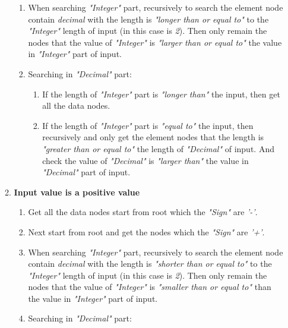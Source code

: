 \begin{enumerate}
\begin{enumerate}
\begin{enumerate}
\item When searching \textit{"Integer"} part, recursively to search the element node contain \textit{decimal} with the length is \textit{"longer than or equal to"} to the \textit{"Integer"} length of input (in this case is \textit{2}). Then only remain the nodes that the value of \textit{"Integer"} is \textit{"larger than or equal to"} the value in \textit{"Integer"} part of input.

\item Searching in \textit{"Decimal"} part:
\begin{enumerate}

\item If the length of \textit{"Integer"} part is \textit{"longer than"} the input, then get all the data nodes.

\item If the length of \textit{"Integer"} part is \textit{"equal to"} the input, then recursively and only get the element nodes that the length is \textit{"greater than or equal to"} the length of \textit{"Decimal"} of input. And check the value of \textit{"Decimal"} is \textit{"larger than"} the value in \textit{"Decimal"} part of input.
\end{enumerate}

\end{enumerate}

\item \textbf{Input value is a positive value}

\begin{enumerate}

\item Get all the data nodes start from root which the \textit{"Sign"} are \textit{'-'}.

\item Next start from root and get the nodes which the \textit{"Sign"} are \textit{'+'}.

\item When searching \textit{"Integer"} part, recursively to search the element node contain \textit{decimal} with the length is \textit{"shorter than or equal to"} to the \textit{"Integer"} length of input (in this case is \textit{2}). Then only remain the nodes that the value of \textit{"Integer"} is \textit{"smaller than or equal to"} than the value in \textit{"Integer"} part of input.

\item Searching in \textit{"Decimal"} part:
\begin{enumerate}


\end{enumerate}
\end{enumerate}
\end{enumerate}
\end{enumerate}
